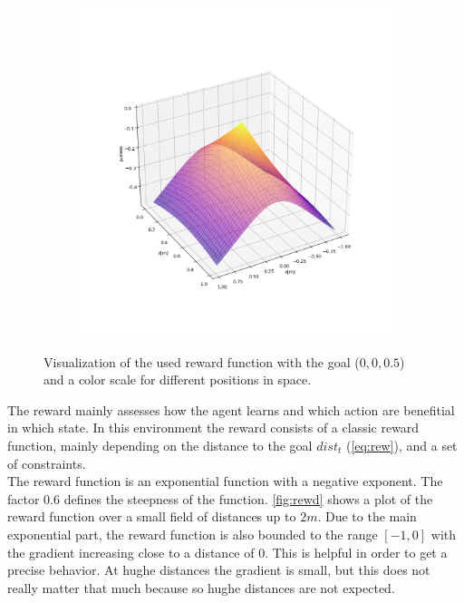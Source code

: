 \begin{figure}
\begin{subfigure}{0.32\linewidth}
		\caption{}
	\end{subfigure}
	\begin{subfigure}{0.32\linewidth}
		\includegraphics[width=\linewidth]{figures/rewXZ.png}
		\caption{}
	\end{subfigure}
	\caption{Visualization of the used reward function with the goal ($0,0,0.5$) and a color scale for different positions in space.}
	\label{fig:rewr}
\end{figure}
The reward mainly assesses how the agent learns and which action are benefitial in which state.
In this environment the reward consists of a classic reward function, mainly depending on the distance to the goal $dist_t$ (\cref{eq:rew}), and a set of constraints.\\
The reward function is an exponential function with a negative exponent. The factor $0.6$ defines the steepness of the function. \cref{fig:rewd} shows a plot of the reward function over a small field of distances up to $2m$.  Due to the main exponential part, the reward function is also bounded to the range $[-1, 0]$ with the gradient increasing close to a distance of $0$. This is helpful in order to get a precise behavior. At hughe distances the gradient is small, but this does not really matter that much because so hughe distances are not expected.
